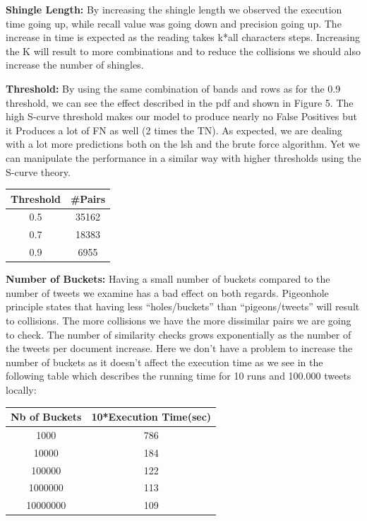 \documentclass[12pt]{article}
\begin{document}
\textbf{Shingle Length:} By increasing the shingle length we observed the execution time going up, while recall value was going down and precision going up. The increase in time is expected as the reading takes k*all characters steps. Increasing the K will result to more combinations and to reduce the collisions we should also increase the number of shingles.

\textbf{Threshold:} By using the same combination of bands and rows as for the 0.9 threshold, we can see the effect described in the pdf and shown in Figure 5. The high S-curve threshold makes our model to produce nearly no False Positives but it Produces a lot of FN as well (2 times the TN). As expected, we are dealing with a lot more predictions both on the lsh and the brute force algorithm. Yet we can manipulate the performance in a similar way with higher thresholds using the S-curve theory.

\begin{center}
 \begin{tabular}{||c |  c||}
 \hline
 Threshold & \#Pairs \\ [0.5ex]
 \hline\hline
0.5 & 35162 \\
 \hline
0.7 & 18383 \\
 \hline
0.9 & 6955 \\
 \hline
\end{tabular}
\end{center}

\textbf{Number of Buckets:} Having a small number of buckets compared to the number of tweets we examine has a bad effect on both regards. Pigeonhole principle states that having less ``holes/buckets'' than ``pigeons/tweets'' will result to collisions. The more collisions we have the more dissimilar pairs we are going to check. The number of similarity checks grows exponentially as the number of the tweets per document increase. Here we don't have a problem to increase the number of buckets as it doesn't affect the execution time as we see in the following table which describes the running time for 10 runs and 100.000 tweets locally: 

\begin{center}
 \begin{tabular}{||c |  c||}
 \hline
 Nb of Buckets & 10*Execution Time(sec) \\ [0.5ex]
 \hline\hline
1000 & 786 \\
 \hline
10000 & 184 \\
 \hline
100000 & 122 \\
 \hline
1000000 & 113 \\
 \hline
10000000 & 109 \\
 \hline
\end{tabular}
\end{center}
\end{document}
